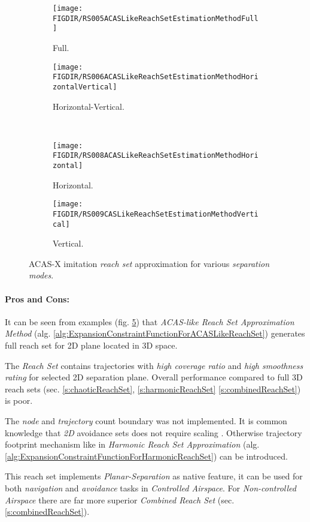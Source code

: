 \begin{figure}[H]
	\centering
    \begin{subfigure}{0.48\textwidth}
        \texttt{[image: \\FIGDIR/RS005ACASLikeReachSetEstimationMethodFull]}
        \caption{Full.}
        \label{fig:acasLikeReachSetFull}
    \end{subfigure}
    \begin{subfigure}{0.48\textwidth}
        \texttt{[image: \\FIGDIR/RS006ACASLikeReachSetEstimationMethodHorizontalVertical]} 
        \caption{Horizontal-Vertical.}
        \label{fig:acasLikeReachSetHorizontalVertical}
    \end{subfigure}
    \\
    \begin{subfigure}{0.48\textwidth}
        \texttt{[image: \\FIGDIR/RS008ACASLikeReachSetEstimationMethodHorizontal]} 
        \caption{Horizontal.}
        \label{fig:acasLikeReachSetHorizontalOnly}
    \end{subfigure}
    \begin{subfigure}{0.48\textwidth}
        \texttt{[image: \\FIGDIR/RS009CASLikeReachSetEstimationMethodVertical]} 
        \caption{Vertical.}
        \label{fig:acasLikeReachSetVerticalOnly}
    \end{subfigure}
    \caption{ACAS-X imitation \emph{reach set} approximation for various \emph{separation modes}. }
    \label{fig:acasLikeReachSetVariousSeparationMode}
\end{figure}

\paragraph{Pros and Cons:} It can be seen from examples (fig. \ref{fig:acasLikeReachSetVariousSeparationMode}) that \emph{ACAS-like Reach Set Approximation Method} (alg. \ref{alg:ExpansionConstraintFunctionForACASLikeReachSet}) generates full reach set for 2D plane located in 3D space. 

The \emph{Reach Set} contains trajectories with \emph{high coverage ratio} and \emph{high smoothness rating} for selected 2D separation plane. Overall performance compared to full 3D reach sets (sec. \ref{s:chaoticReachSet}, \ref{s:harmonicReachSet} \ref{s:combinedReachSet}) is poor. 

The \emph{node} and \emph{trajectory} count boundary was not implemented. It is common knowledge that \emph{2D} avoidance sets does not require scaling \cite{marston2015acas}. Otherwise trajectory footprint mechanism like in \emph{Harmonic Reach Set Approximation} (alg. \ref{alg:ExpansionConstraintFunctionForHarmonicReachSet}) can be introduced.

This reach set implements \emph{Planar-Separation} as native feature, it can be used for both \emph{navigation} and \emph{avoidance} tasks in \emph{Controlled Airspace}. For \emph{Non-controlled Airspace} there are far more superior \emph{Combined Reach Set} (sec. \ref{s:combinedReachSet}).
